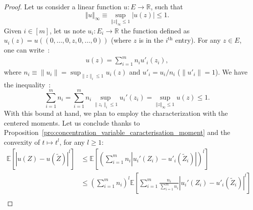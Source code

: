 \documentclass{ws-rmta}
\begin{document}
  \begin{proof}
    Let us consider a linear function $u: E \rightarrow \mathbb{R}$, such that $$\left\Vert u\right\Vert_{\infty} \equiv \sup_{\left\Vert z\right\Vert_{\infty}\leq 1} \vert u(z)\vert \leq 1.$$
    Given $i\in [m]$, let us note $u_i : E_i \rightarrow \mathbb R$ the function defined as $u_i(z) = u((0,\ldots,0,z,0,\ldots,0))$ (where $z$ is in the $i^{\text{th}}$ entry). For any $z\in E$, one can write~:
    \begin{align*}
      u(z) = \sum _{i=1}^m n_i u'_i(z_i), 
    \end{align*}
    where $n_i \equiv \|u_i\| = \sup_{\|z \|_i\leq 1} u_i(z)$ and $u'_i = u_i/n_i$ ($\| u'_i\| =1$). We have the inequality~:
    $$\sum _{i=1}^m n_i = \sum_{i=1}^m n_i\sup_{\|z_i\|_i \leq 1} u_i'(z_i) = \sup_{\Vert z \Vert_\infty \leq 1} u(z) \leq 1.$$
    With this bound at hand, we plan to employ the characterization with the centered moments. Let us conclude thanks to Proposition~\ref{pro:concentration_variable_caracterisation_moment} and the convexity of $t \mapsto t^l$, for any $l \geq 1$:
  \begin{align*}
    \mathbb{E}\left[\left\vert u(Z)-u(\tilde Z)\right\vert^l\right]
    &\leq \mathbb{E}\left[ \left( \sum_{i=1}^{m} n_i \left\vert u_i'\left(Z_i\right)-u'_i\left(\tilde Z_i\right)\right\vert \right)^l \right] \\
    &\leq \left( \sum_{i=1}^{m} n_i \right)^l \mathbb{E}\left[ \sum_{i=1}^{m} \frac{n_i}{ \sum_{i=1}^{m} n_i} \left\vert u_i'\left(Z_i\right)-u'_i\left(\tilde Z_i\right)\right\vert^l \right] \\

\end{align*}
\end{proof}
\end{document}
